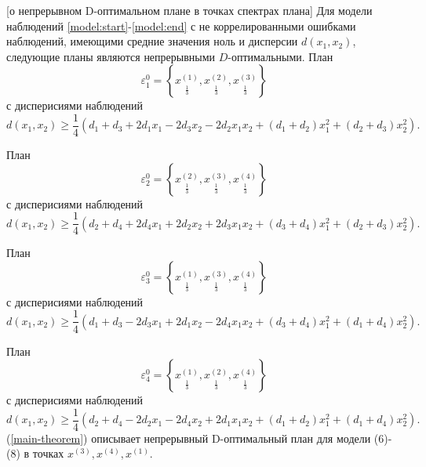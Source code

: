 	\begin{theorem}\label{main-theorem}[о непрерывном D-оптимальном плане в точках спектрах плана]
		Для модели наблюдений \eqref{model:start}-\eqref{model:end} с не коррелированными ошибками наблюдений, имеющими средние значения ноль и дисперсии $d(x_1, x_2)$, следующие планы являются непрерывными $D$-оптимальными. План
		\begin{equation} \label{main-theorem:plan-1}
			\varepsilon_1^{0} = \left \{ 
				\underset{\frac 1 3} {x^{(1)}},
				\underset{\frac 1 3} {x^{(2)}},
				\underset{\frac 1 3} {x^{(3)}}
			\right \}
		\end{equation}
		с дисперисиями наблюдений
		\begin{equation}
			d(x_1, x_2) \ge \frac 1 4 (d_1 + d_3 + 2 d_1 x_1 - 2 d_3 x_2 - 2d_2 x_1 x_2 + (d_1 + d_2)x_1^2 + (d_2 + d_3)x_2^2).
		\end{equation}
		
		План
		\begin{equation}
			\varepsilon_2^{0} = \left \{ 
				\underset{\frac 1 3} {x^{(2)}},
				\underset{\frac 1 3} {x^{(3)}},
				\underset{\frac 1 3} {x^{(4)}}
			\right \}
		\end{equation}
		с дисперисиями наблюдений
		\begin{equation}
			d(x_1, x_2) \ge \frac 1 4 (d_2 + d_4 + 2 d_4 x_1 + 2 d_2 x_2 + 2 d_3 x_1 x_2 + (d_3 + d_4)x_1^2 + (d_2 + d_3)x_2^2).
		\end{equation}
		
		План
		\begin{equation}
			\varepsilon_3^{0} = \left \{ 
				\underset{\frac 1 3} {x^{(1)}},
				\underset{\frac 1 3} {x^{(3)}},
				\underset{\frac 1 3} {x^{(4)}}
			\right \}
		\end{equation}
		с дисперисиями наблюдений
		\begin{equation}
			d(x_1, x_2) \ge \frac 1 4 (d_1 + d_3 - 2 d_3 x_1 + 2 d_1 x_2 - 2 d_4 x_1 x_2 + (d_3 + d_4)x_1^2 + (d_1 + d_4)x_2^2).
		\end{equation}
		
		План
		\begin{equation}
			\varepsilon_4^{0} = \left \{ 
				\underset{\frac 1 3} {x^{(1)}},
				\underset{\frac 1 3} {x^{(2)}},
				\underset{\frac 1 3} {x^{(4)}}
			\right \}
		\end{equation}
		с дисперисиями наблюдений
		\begin{equation}
			d(x_1, x_2) \ge \frac 1 4 (d_2 + d_4 - 2 d_2 x_1 - 2 d_4 x_2 + 2 d_1 x_1 x_2 + (d_1 + d_2)x_1^2 + (d_1 + d_4)x_2^2).
		\end{equation}
		(\ref{main-theorem}) описывает непрерывный D-оптимальный план для модели (6)-(8) в точках $x^{(3)}, x^{(4)}, x^{(1)}$.\\
	\end{theorem}
